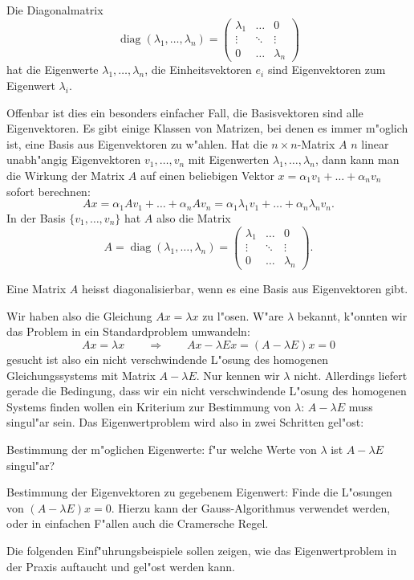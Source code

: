 \begin{hilfssatz}
Die Diagonalmatrix
\[
\operatorname{diag}(\lambda_1,\dots,\lambda_n)
=\begin{pmatrix}
\lambda_1&\dots&0\\
\vdots&\ddots&\vdots\\
0&\dots&\lambda_n
\end{pmatrix}
\]
hat die Eigenwerte $\lambda_1,\dots,\lambda_n$, die Einheitsvektoren
$e_i$ sind Eigenvektoren zum Eigenwert $\lambda_i$.
\end{hilfssatz}
Offenbar ist dies ein besonders einfacher Fall, die Basisvektoren sind
alle Eigenvektoren. Es gibt einige Klassen von Matrizen, bei denen es
immer m"oglich ist, eine Basis aus Eigenvektoren zu w"ahlen. Hat die
$n\times n$-Matrix $A$ $n$ linear unabh"angig Eigenvektoren $v_1,\dots,v_n$
mit Eigenwerten $\lambda_1,\dots,\lambda_n$, dann kann man die Wirkung
der Matrix $A$ auf einen beliebigen Vektor $x=\alpha_1v_1+\dots+\alpha_nv_n$
sofort berechnen:
\[
Ax=\alpha_1Av_1+\dots+\alpha_nAv_n=\alpha_1\lambda_1v_1+\dots+\alpha_n\lambda_nv_n.
\]
In der Basis $\{v_1,\dots,v_n\}$ hat $A$ also die Matrix
\[
A=\operatorname{diag}(\lambda_1,\dots,\lambda_n)
=
\begin{pmatrix}
\lambda_1&\dots&0\\
\vdots&\ddots&\vdots\\
0&\dots&\lambda_n
\end{pmatrix}.
\]
\begin{definition}
Eine Matrix $A$ heisst diagonalisierbar, wenn es eine Basis aus
Eigenvektoren gibt.
\end{definition}

Wir haben also die Gleichung $Ax=\lambda x$ zu l"osen. W"are 
$\lambda$ bekannt, k"onnten wir das Problem in ein Standardproblem
umwandeln:
\[
Ax=\lambda x\qquad\Rightarrow\qquad Ax-\lambda Ex=(A-\lambda E)x=0
\]
gesucht ist also ein nicht verschwindende L"osung des homogenen
Gleichungssystems mit
Matrix $A-\lambda E$. Nur kennen wir $\lambda$ nicht. Allerdings
liefert gerade die Bedingung, dass wir ein nicht verschwindende
L"osung des homogenen Systems finden wollen ein Kriterium zur
Bestimmung von $\lambda$: $A-\lambda E$ muss singul"ar sein.
Das Eigenwertproblem wird also in zwei Schritten gel"ost:
\begin{compactenum}
\item Bestimmung der m"oglichen Eigenwerte: f"ur welche Werte von $\lambda$
ist $A-\lambda E$ singul"ar?
\item Bestimmung der Eigenvektoren zu gegebenem Eigenwert: Finde die
L"osungen von $(A-\lambda E)x=0$. Hierzu kann der Gauss-Algorithmus
verwendet werden, oder in einfachen F"allen auch die Cramersche Regel.
\end{compactenum}
Die folgenden Einf"uhrungsbeispiele sollen zeigen, wie das Eigenwertproblem
in der Praxis auftaucht und gel"ost werden kann. 

